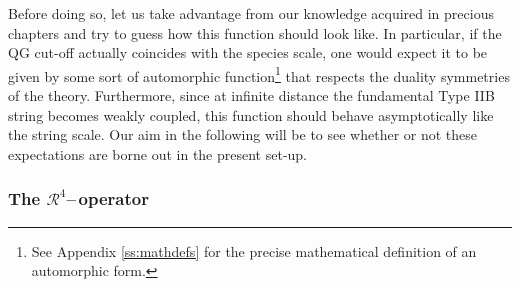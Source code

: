 Before doing so, let us take advantage from our knowledge acquired in precious chapters and try to guess how this function should look like. In particular, if the QG cut-off actually coincides with the species scale, one would expect it to be given by some sort of automorphic function\footnote{See Appendix \ref{ss:mathdefs} for the precise mathematical definition of an automorphic form.} that respects the duality symmetries of the theory. Furthermore, since at infinite distance the fundamental Type IIB string becomes weakly coupled, this function should behave asymptotically like the string scale. Our aim in the following will be to see whether or not these expectations are borne out in the present set-up.

\subsubsection*{The $\mathcal{R}^4$--\,operator}


